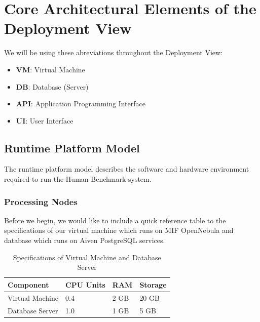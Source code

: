 
\section{Core Architectural Elements of the Deployment View}
We will be using these abreviations throughout the Deployment View:
\begin{itemize}
    \item \textbf{VM}: Virtual Machine
    \item \textbf{DB}: Database (Server)
    \item \textbf{API}: Application Programming Interface
    \item \textbf{UI}: User Interface
\end{itemize}

\subsection{Runtime Platform Model}
The runtime platform model describes the software and hardware environment
required to run the Human Benchmark system.

\subsubsection{Processing Nodes}
Before we begin, we would like to include a quick reference table to the specifications of our virtual machine
which runs on MIF OpenNebula and database which runs on Aiven PostgreSQL services.

\begin{table}[H]
    \centering
    \caption{Specifications of Virtual Machine and Database Server}
    \label{tab:vm_db_specs}
    \begin{tabular}{|p{}|p{}|p{}|p{}|}
        \hline
        \textbf{Component} & \textbf{CPU Units} & \textbf{RAM} & \textbf{Storage} \\
        \hline
        Virtual Machine    & 0.4                & 2 GB         & 20 GB            \\
        \hline
        Database Server    & 1.0                & 1 GB         & 5 GB             \\
        \hline
    \end{tabular}
\end{table}

